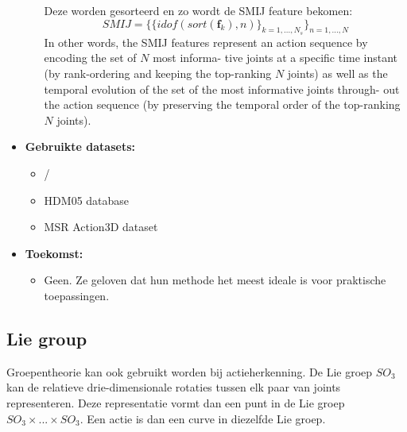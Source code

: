\begin{itemize}
\begin{enumerate}
		Deze worden gesorteerd en zo wordt de SMIJ feature bekomen:
		$$ SMIJ = \{\{ idof(sort(\textbf{f}_k) ,n)\}_{k=1,...,N_s}\}_{n=1,...,N}$$
		In other words, the SMIJ features represent an action sequence by encoding the set of $N$ most informa- tive joints at a specific time instant (by rank-ordering and keeping the top-ranking $N$ joints) as well as the temporal evolution of the set of the most informative joints through- out the action sequence (by preserving the temporal order of
		the top-ranking $N$ joints).
	\end{enumerate}
	\item \textbf{Gebruikte datasets:}
	\begin{itemize}
		\item /
		\item HDM05 database
		\item MSR Action3D dataset
	\end{itemize}
	\item \textbf{Toekomst:}
	\begin{itemize}
		\item {\color{red}Geen. Ze geloven dat hun methode het meest ideale is voor praktische toepassingen.}
	\end{itemize}
\end{itemize}

\subsection{Lie group}
Groepentheorie kan ook gebruikt worden bij actieherkenning. De Lie groep $SO_3$ kan de relatieve drie-dimensionale rotaties tussen elk paar van joints representeren. Deze representatie vormt dan een punt in de Lie groep $SO_3 \times ... \times SO_3$. Een actie is dan een curve in diezelfde Lie groep.

